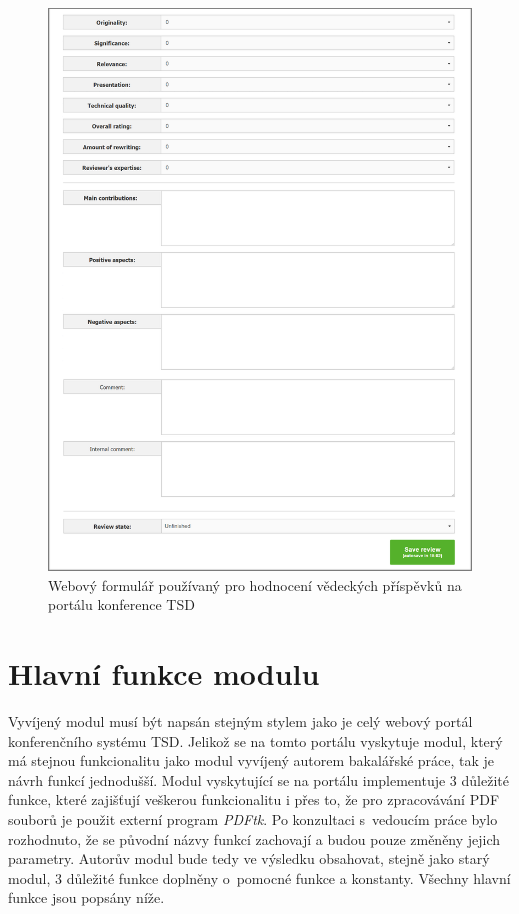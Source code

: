 \begin{figure}[h!]
\centering
\includegraphics[width=15cm]{img/web_formular}
\caption{Webový formulář používaný pro hodnocení vědeckých příspěvků na portálu konference TSD}
\label{fig:web_formular}
\end{figure}

\section{Hlavní funkce modulu}
Vyvíjený modul musí být napsán stejným stylem jako je celý webový portál konferenčního systému TSD. Jelikož se na tomto portálu vyskytuje modul, který má stejnou funkcionalitu jako modul vyvíjený autorem bakalářské práce, tak je návrh funkcí jednodušší. Modul vyskytující se na portálu implementuje 3 důležité funkce, které zajišťují veškerou funkcionalitu i přes to, že pro zpracovávání PDF souborů je použit externí program \textit{PDFtk}. Po konzultaci s~vedoucím práce bylo rozhodnuto, že se původní názvy funkcí zachovají a budou pouze změněny jejich parametry. Autorův modul bude tedy ve výsledku obsahovat, stejně jako starý modul, 3 důležité funkce doplněny o~pomocné funkce a konstanty. Všechny hlavní funkce jsou popsány níže.  

